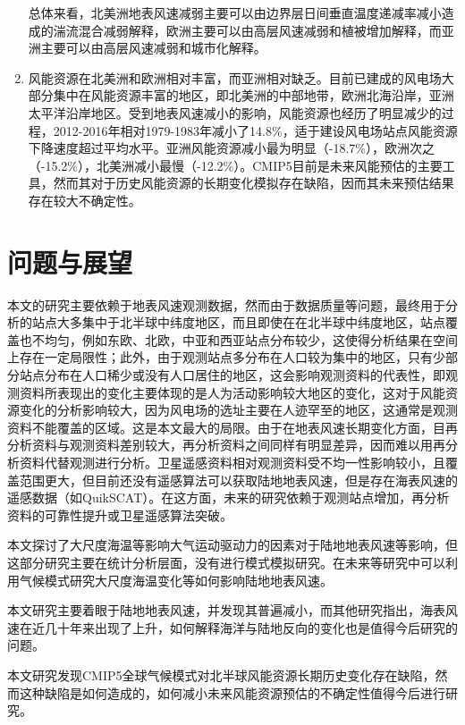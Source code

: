 \begin{enumerate}
总体来看，北美洲地表风速减弱主要可以由边界层日间垂直温度递减率减小造成的湍流混合减弱解释，欧洲主要可以由高层风速减弱和植被增加解释，而亚洲主要可以由高层风速减弱和城市化解释。

\item 风能资源在北美洲和欧洲相对丰富，而亚洲相对缺乏。目前已建成的风电场大部分集中在风能资源丰富的地区，即北美洲的中部地带，欧洲北海沿岸，亚洲太平洋沿岸地区。受到地表风速减小的影响，风能资源也经历了明显减少的过程，2012-2016年相对1979-1983年减小了14.8\%，适于建设风电场站点风能资源下降速度超过平均水平。亚洲风能资源减小最为明显（-18.7\%），欧洲次之（-15.2\%），北美洲减小最慢（-12.2\%）。CMIP5目前是未来风能预估的主要工具，然而其对于历史风能资源的长期变化模拟存在缺陷，因而其未来预估结果存在较大不确定性。

\end{enumerate}

\section{问题与展望}

本文的研究主要依赖于地表风速观测数据，然而由于数据质量等问题，最终用于分析的站点大多集中于北半球中纬度地区，而且即使在在北半球中纬度地区，站点覆盖也不均匀，例如东欧、北欧，中亚和西亚站点分布较少，这使得分析结果在空间上存在一定局限性；此外，由于观测站点多分布在人口较为集中的地区，只有少部分站点分布在人口稀少或没有人口居住的地区，这会影响观测资料的代表性，即观测资料所表现出的变化主要体现的是人为活动影响较大地区的变化，这对于风能资源变化的分析影响较大，因为风电场的选址主要在人迹罕至的地区，这通常是观测资料不能覆盖的区域。这是本文最大的局限。由于在地表风速长期变化方面，目再分析资料与观测资料差别较大，再分析资料之间同样有明显差异，因而难以用再分析资料代替观测进行分析。卫星遥感资料相对观测资料受不均一性影响较小，且覆盖范围更大，但目前还没有遥感算法可以获取陆地地表风速，但是存在海表风速的遥感数据（如QuikSCAT）。在这方面，未来的研究依赖于观测站点增加，再分析资料的可靠性提升或卫星遥感算法突破。

本文探讨了大尺度海温等影响大气运动驱动力的因素对于陆地地表风速等影响，但这部分研究主要在统计分析层面，没有进行模式模拟研究。在未来等研究中可以利用气候模式研究大尺度海温变化等如何影响陆地地表风速。

本文研究主要着眼于陆地地表风速，并发现其普遍减小，而其他研究指出，海表风速在近几十年来出现了上升，如何解释海洋与陆地反向的变化也是值得今后研究的问题。

本文研究发现CMIP5全球气候模式对北半球风能资源长期历史变化存在缺陷，然而这种缺陷是如何造成的，如何减小未来风能资源预估的不确定性值得今后进行研究。

